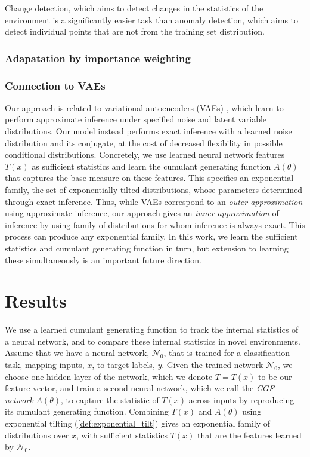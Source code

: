 \documentclass[11pt]{article}      %
\begin{document}
Change detection, which aims to detect changes in the statistics of the environment is a significantly easier task than anomaly detection, which aims to detect individual points that are not from the training set distribution.


\subsubsection{Adapatation by importance weighting}





\subsubsection{Connection to VAEs}

Our approach is related to variational autoencoders (VAEs) \cite{kingma_auto-encoding_2013}, which learn to perform approximate inference under specified noise and latent variable distributions. 
Our model instead performs exact inference with a learned noise distribution and its conjugate, at the cost of decreased flexibility in possible conditional distributions.
Concretely, we use learned neural network features $T(x)$ as sufficient statistics and learn the cumulant generating function $A(\theta)$ that captures the base measure on these features.
This specifies an exponential family, the set of exponentially tilted distributions, whose parameters determined through exact inference.
Thus, while VAEs correspond to an \textit{outer approximation} using approximate inference, our approach gives an \textit{inner approximation} of inference by using family of distributions for whom inference is always exact.
This process can produce any exponential family.
In this work, we learn the sufficient statistics and cumulant generating function in turn, but extension to learning these simultaneously is an important future direction.





\section{Results}

We use a learned cumulant generating function to track the internal statistics of a neural network, and to compare these internal statistics in novel environments.
Assume that we have a neural network, $\mathcal{N}_0$, that is trained for a classification task, mapping inputs, $x$, to target labels, $y$.
Given the trained network $\mathcal{N}_0$, we choose one hidden layer of the network, which we denote $T=T(x)$ to be our feature vector, and train a second neural network, which we call the \textit{CGF network} $A(\theta)$, to capture the statistic of $T(x)$ across inputs by reproducing its cumulant generating function. 
Combining $T(x)$ and $A(\theta)$ using exponential tilting (\ref{def:exponential_tilt}) gives an exponential family of distributions over $x$, with sufficient statistics $T(x)$ that are the features learned by $\mathcal{N}_0$.
\end{document}
